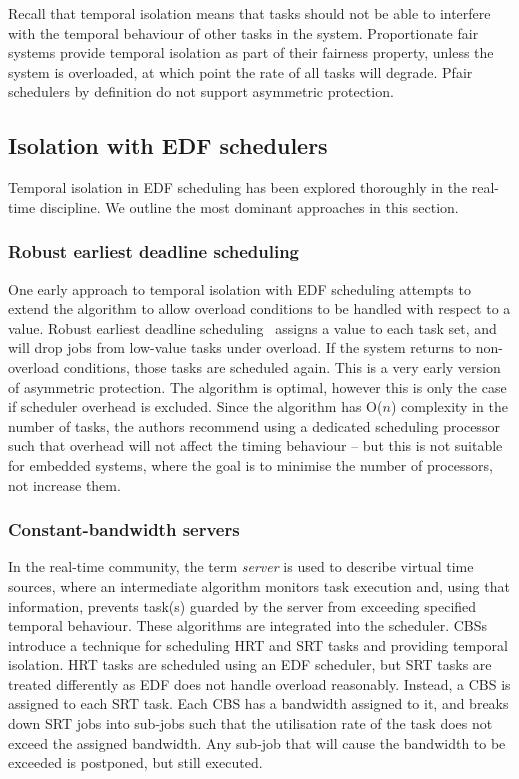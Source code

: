 Recall that temporal isolation means that tasks should not be able to interfere with the temporal
behaviour of other tasks in the system.  Proportionate fair systems provide temporal isolation as
part of their fairness property, unless the system is overloaded, at which point the rate of all
tasks will degrade. Pfair schedulers by definition do not support asymmetric protection.

\subsection{Isolation with EDF schedulers}

Temporal isolation in \gls{EDF} scheduling has been explored thoroughly in the real-time discipline.
We outline the most dominant approaches in this section.

\subsubsection{Robust earliest deadline scheduling}

One early approach to temporal isolation with \gls{EDF} scheduling attempts to extend the 
algorithm to allow overload conditions to be handled with respect to a value. Robust earliest deadline
scheduling~\citep{Buttazzo_Stankovic_93} assigns a value to each task set, and will drop jobs from
low-value tasks under overload. If the system returns to non-overload conditions, those tasks are
scheduled again. This is a very early version of asymmetric protection.
The algorithm is optimal, however this is only the case if
scheduler overhead is excluded.  Since the algorithm has O($n$) complexity in the number of
tasks, the authors recommend using a dedicated scheduling processor such that overhead will not
affect the timing behaviour -- but this is not suitable for embedded systems, where the goal is to
minimise the number of processors, not increase them.

\subsubsection{Constant-bandwidth servers}

In the real-time community, the term \emph{server} is used to describe virtual time sources, where
an intermediate algorithm monitors task execution and, using that information, prevents task(s)
guarded by the server from exceeding specified temporal behaviour. These algorithms are integrated
into the scheduler.
\Glspl{CBS}~\citep{Abeni_Buttazzo_04} introduce a technique for scheduling \gls{HRT} and
\gls{SRT} tasks and providing temporal isolation.  \gls{HRT} tasks are scheduled using an \gls{EDF}
scheduler, but \gls{SRT} tasks are treated differently as \gls{EDF} does not handle overload
reasonably.
Instead, a \gls{CBS} is assigned to each \gls{SRT} task.  Each \gls{CBS} has a bandwidth assigned to
it, and breaks down \gls{SRT} jobs into sub-jobs such that the utilisation rate of the task does not
exceed the assigned bandwidth.  Any sub-job that will cause the bandwidth to be exceeded is
postponed, but still executed.

